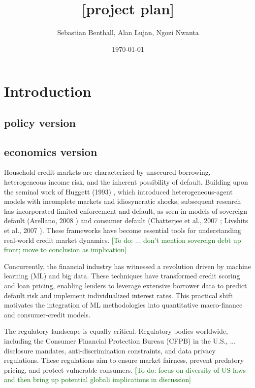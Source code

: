 \documentclass[acmsmall]{acmart}
\title{[project plan]}
\author{Sebastian Benthall, Alan Lujan, Ngozi Nwanta}
\date{\today}
\newcommand{\todo}[1]{\textcolor{DarkGreen}{[To do: #1]}}
\begin{document}
\maketitle

\section{Introduction}

\subsection{policy version}

\subsection{economics version}


Household credit markets are characterized by unsecured borrowing, heterogeneous income risk, and the inherent possibility of default. Building upon the seminal work of Huggett (1993) \cite{Huggett1993}, which introduced heterogeneous-agent models with incomplete markets and idiosyncratic shocks, subsequent research has incorporated limited enforcement and default, as seen in models of sovereign default (Arellano, 2008 \cite{Arellano2008}) and consumer default (Chatterjee et al., 2007 \cite{Chatterjee2007}; Livshits et al., 2007 \cite{Livshits2007}). These frameworks have become essential tools for understanding real-world credit market dynamics.
\todo{... don't mention sovereign debt up front; move to conclusion as implication}

Concurrently, the financial industry has witnessed a revolution driven by machine learning (ML) and big data. These techniques have transformed credit scoring and loan pricing, enabling lenders to leverage extensive borrower data to predict default risk and implement individualized interest rates. This practical shift motivates the integration of ML methodologies into quantitative macro-finance and consumer-credit models.

The regulatory landscape is equally critical. Regulatory bodies worldwide, including the Consumer Financial Protection Bureau (CFPB) in the U.S., ...  disclosure mandates, anti-discrimination constraints, and data privacy regulations. These regulations aim to ensure market fairness, prevent predatory pricing, and protect vulnerable consumers.
\todo{focus on diversity of US laws and then bring up potential globali implications in discussion}
\end{document}
